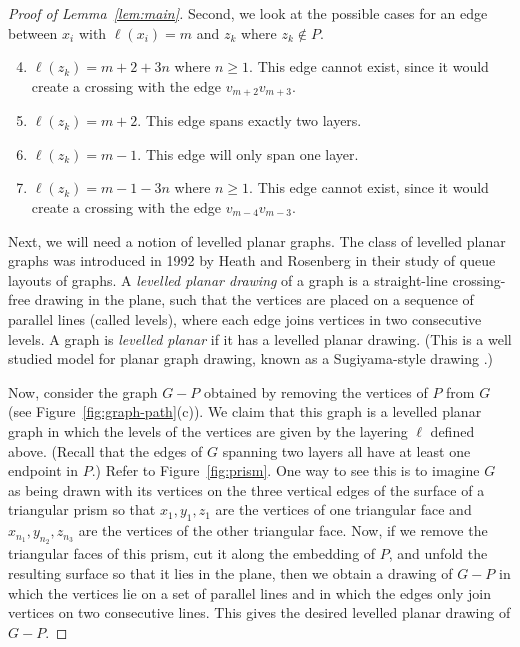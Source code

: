 \documentclass{jgaa-art}
\newcommand{\figref}[1]{\mbox{Figure~\ref{fig:#1}}}
\newcommand{\lemref}[1]{Lemma~\ref{lem:#1}}
\begin{document}
\begin{proof}[Proof of \lemref{main}]
  Second, we look at the possible cases for an edge between $x_i$ with $\ell(x_i) = m$ and $z_k$ where $z_k \notin P$.
 \begin{enumerate}
  \setcounter{enumi}{3}
  	\item $\ell(z_k) = m+2+3n$ where $n \geq 1$. This edge cannot exist, since it would create a crossing with the edge $v_{m+2}v_{m+3}$.
  	\item$\ell(z_k) =  m+2$. This edge spans exactly two layers.
  	\item$\ell(z_k) =  m-1$. This edge will only span one layer.
  	\item $\ell(z_k) =  m-1-3n$ where $n \geq 1$. This edge cannot exist, since it would create a crossing with the edge $v_{m-4}v_{m-3}$.
  \end{enumerate}


  Next, we will need a notion of levelled planar graphs. The class of levelled
  planar graphs was introduced in 1992 by Heath and Rosenberg
  \cite{HR-SJC92} in their study of queue layouts of graphs. A \emph{levelled
  planar drawing} of a graph is a straight-line crossing-free drawing in
  the plane, such that the vertices are placed on a sequence of parallel
  lines (called levels), where each edge joins vertices in two
  consecutive levels. A graph is \emph{levelled planar} if it has a levelled
  planar drawing. (This is a well studied model for planar
  graph drawing, known as a Sugiyama-style drawing \cite{STT81,BM2001,HN2013,BETT99}.)

  Now, consider the graph $G-P$ obtained by removing the vertices of $P$
  from $G$ (see \figref{graph-path}(c)).  We claim that this graph is a levelled
  planar graph in which the levels
  of the vertices are given by the layering $\ell$ defined above. (Recall that the edges of $G$ spanning two layers all have at least one endpoint in $P$.)
  Refer to \figref{prism}. One way to see this is to imagine $G$
  as being drawn with its vertices on the three vertical edges of the surface of
  a triangular prism so that $x_1,y_1,z_1$ are the vertices of one
  triangular face and $x_{n_1},y_{n_2},z_{n_3}$ are the vertices of
  the other triangular face.  Now, if we remove the triangular faces
  of this prism, cut it along the embedding of $P$, and unfold
  the resulting surface so that it lies in the plane, then we obtain a
  drawing of $G-P$ in which the vertices lie on a set of parallel lines
  and in which the edges only join vertices on two consecutive lines.
  This gives the desired levelled planar drawing of $G-P$.


\end{proof}
\end{document}
